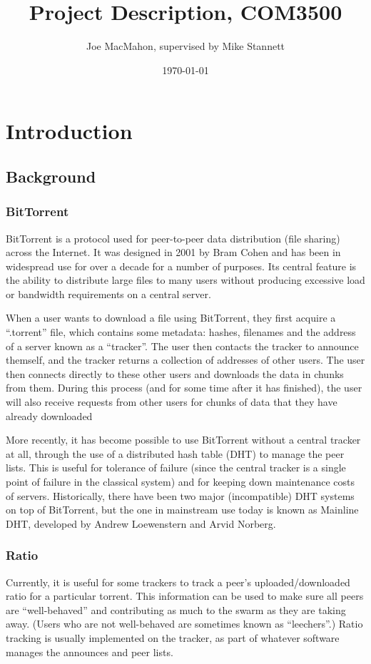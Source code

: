 \documentclass{article}
\title{Project Description, COM3500}
\author{Joe MacMahon, supervised by Mike Stannett}
\date{\today}
\begin{document}
\maketitle

\section{Introduction}
\subsection{Background}
\subsubsection{BitTorrent}
BitTorrent is a protocol used for peer-to-peer data distribution (file sharing) across the Internet.  It was designed in 2001 by Bram Cohen and has been in widespread use for over a decade for a number of purposes.  Its central feature is the ability to distribute large files to many users without producing excessive load or bandwidth requirements on a central server.

When a user wants to download a file using BitTorrent, they first acquire a ``.torrent'' file, which contains some metadata: hashes, filenames and the address of a server known as a ``tracker''.  The user then contacts the tracker to announce themself, and the tracker returns a collection of addresses of other users.  The user then connects directly to these other users and downloads the data in chunks from them.  During this process (and for some time after it has finished), the user will also receive requests from other users for chunks of data that they have already downloaded

More recently, it has become possible to use BitTorrent without a central tracker at all, through the use of a distributed hash table (DHT) to manage the peer lists.  This is useful for tolerance of failure (since the central tracker is a single point of failure in the classical system) and for keeping down maintenance costs of servers.  Historically, there have been two major (incompatible) DHT systems on top of BitTorrent, but the one in mainstream use today is known as Mainline DHT, developed by Andrew Loewenstern and Arvid Norberg.

\subsubsection{Ratio}
Currently, it is useful for some trackers to track a peer's uploaded/downloaded ratio for a particular torrent.  This information can be used to make sure all peers are ``well-behaved'' and contributing as much to the swarm as they are taking away.  (Users who are not well-behaved are sometimes known as ``leechers''.)  Ratio tracking is usually implemented on the tracker, as part of whatever software manages the announces and peer lists.
\end{document}
